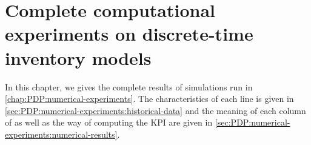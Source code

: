 \chapter{Complete computational experiments on discrete-time inventory models}
\label{chap:appendix:pdp:numerical-experiments}


In this chapter, we gives the complete results of simulations run in \cref{chap:PDP:numerical-experiments}.
The characteristics of each line is given in \cref{sec:PDP:numerical-experiments:historical-data} and the meaning of each column of  as well as the way of computing the KPI are given in \cref{sec:PDP:numerical-experiments:numerical-results}.



\newpage

%





\newpage
